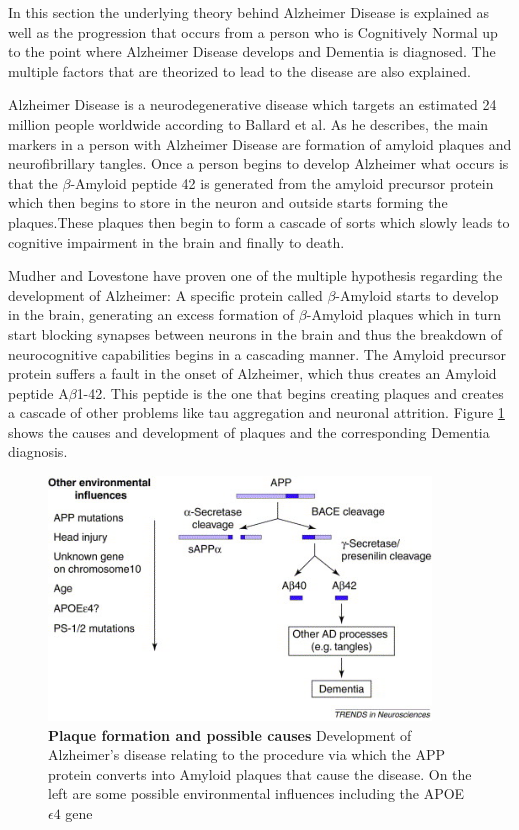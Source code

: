 In this section the underlying theory behind Alzheimer Disease is explained as well as the progression that occurs from a person who is Cognitively Normal up to the point where Alzheimer Disease develops and Dementia is diagnosed. The multiple factors that are theorized to lead to the disease are also explained.

Alzheimer Disease is a neurodegenerative disease which targets an estimated 24 million people worldwide according to Ballard et al\cite{Ballard2011}. As he describes, the main markers in a person with Alzheimer Disease are formation of amyloid plaques and neurofibrillary tangles. Once a person begins to develop Alzheimer what occurs is that the $\beta$-Amyloid peptide 42 is generated from the amyloid precursor protein which then begins to store in the neuron and outside starts forming the plaques.These plaques then begin to form a cascade of sorts which slowly leads to cognitive impairment in the brain and finally to death. 

Mudher and  Lovestone\cite{Mudher2002} have proven one of the multiple hypothesis regarding the development of Alzheimer: A specific protein called $\beta$-Amyloid starts to develop in the brain, generating an excess formation of $\beta$-Amyloid plaques which in turn start blocking synapses between neurons in the brain and thus the breakdown of neurocognitive capabilities begins in a cascading manner. The Amyloid precursor protein suffers a fault in the onset of Alzheimer, which thus creates an Amyloid peptide A$\beta$1-42.
This peptide is the one that begins creating plaques and creates a cascade of other problems like tau aggregation and neuronal attrition. Figure \ref{gr1} shows the causes and development of plaques and the corresponding Dementia diagnosis.
\label{betaAmyloid}

\begin{figure}[!ht]
\centerline{\includegraphics[width=4in]{images/background/gr1.jpg}}
\caption{{\bf Plaque formation and possible causes\cite{Mudher2002}} Development of Alzheimer's disease relating to the procedure via which the APP protein converts into Amyloid plaques that cause the disease. On the left are some possible environmental influences including the APOE $\epsilon4$ gene}
\label{gr1}
\end{figure}


